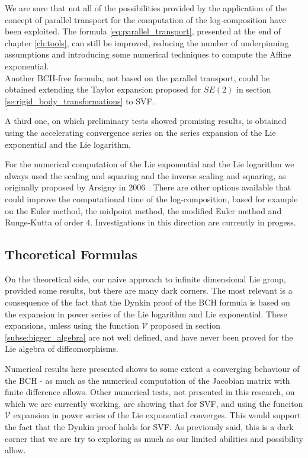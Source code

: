 We are sure that not all of the possibilities provided by the application of the concept of parallel transport for the computation of the log-composition have been exploited. The formula \ref{eq:parallel_transport}, presented at the end of chapter \ref{ch:tools}, can still be improved, reducing the number of underpinning assumptions and introducing some numerical techniques to compute the Affine exponential.\\

Another BCH-free formula, not based on the parallel transport, could be obtained extending the Taylor expansion proposed for $SE(2)$ in section \ref{se:rigid_body_transformations} to SVF.

A third one, on which  preliminary tests showed promising results, is obtained using the accelerating convergence series \cite{cohen2000convergence} on the series expansion of the Lie exponential and the Lie logarithm. 

For the numerical computation of the Lie exponential and the Lie logarithm we always used the scaling and squaring and the inverse scaling and squaring, as originally proposed by Arsigny in $2006$ \cite{arsigny2006log}. There are other options available that could improve the computational time of the log-composition, based for example on the Euler method, the midpoint method, the modified Euler method and Runge-Kutta of order $4$. Investigations in this direction are currently in progess.


\subsection{Theoretical Formulas}

On the theoretical side, our naive approach to infinite dimensional Lie group, provided some results, but there are many dark corners. The most relevant is a consequence of the fact that the Dynkin proof of the BCH formula is based on the expansion in power series of the Lie logarithm and Lie exponential. These expansions, unless using the function $\mathcal{V}$ proposed in section \ref{subse:bigger_algebra} are not well defined, and have never been proved for the Lie algebra of diffeomorphisms.

Numerical results here presented shows to some extent a converging behaviour of the BCH - as much as the numerical computation of the Jacobian matrix with finite difference allows.
Other numerical tests, not presented in this research, on which we are currently working, are showing that for SVF, and using the funciton $\mathcal{V}$ expansion in power series of the Lie exponential converges. This would support the fact that the Dynkin proof holds for SVF. As previously said, this is a dark corner that we are try to exploring as much as our limited abilities and possibility allow.

